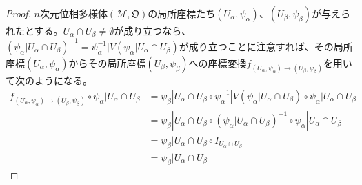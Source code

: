\documentclass[dvipdfmx]{jsarticle}
\begin{document}
\begin{proof}
$n$次元位相多様体$\left( \mathcal{M},\mathfrak{O} \right)$の局所座標たち$\left( U_{\alpha},\psi_{\alpha} \right)$、$\left( U_{\beta},\psi_{\beta} \right)$が与えられたとする。$U_{\alpha} \cap U_{\beta} \neq \emptyset$が成り立つなら、$\left( \psi_{\alpha}|U_{\alpha} \cap U_{\beta} \right)^{- 1} = \psi_{\alpha}^{- 1}|V\left( \psi_{\alpha}|U_{\alpha} \cap U_{\beta} \right)$が成り立つことに注意すれば、その局所座標$\left( U_{\alpha},\psi_{\alpha} \right)$からその局所座標$\left( U_{\beta},\psi_{\beta} \right)$への座標変換$f_{\left( U_{\alpha},\psi_{\alpha} \right) \rightarrow \left( U_{\beta},\psi_{\beta} \right)}$を用いて次のようになる。
\begin{align*}
f_{\left( U_{\alpha},\psi_{\alpha} \right) \rightarrow \left( U_{\beta},\psi_{\beta} \right)} \circ \psi_{\alpha}|U_{\alpha} \cap U_{\beta} &= \psi_{\beta}|U_{\alpha} \cap U_{\beta} \circ \psi_{\alpha}^{- 1}|V\left( \psi_{\alpha}|U_{\alpha} \cap U_{\beta} \right) \circ \psi_{\alpha}|U_{\alpha} \cap U_{\beta}\\
&= \psi_{\beta}|U_{\alpha} \cap U_{\beta} \circ \left( \psi_{\alpha}|U_{\alpha} \cap U_{\beta} \right)^{- 1} \circ \psi_{\alpha}|U_{\alpha} \cap U_{\beta}\\
&= \psi_{\beta}|U_{\alpha} \cap U_{\beta} \circ I_{U_{\alpha} \cap U_{\beta}}\\
&= \psi_{\beta}|U_{\alpha} \cap U_{\beta}
\end{align*}
\end{proof}
\end{document}

